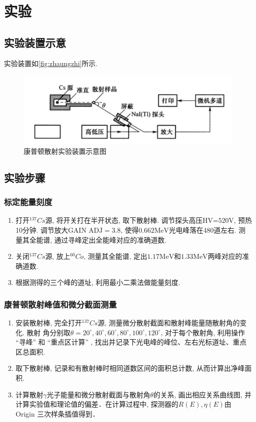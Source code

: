 \documentclass[font=default]{mpltx}
\begin{document}
\section{实验}
\subsection{实验装置示意}
实验装置如\autoref{fig:zhaungzhi}所示. 

\begin{figure}[htbp]
  \centering
  \includegraphics[width=0.6\linewidth]{fig/zhuangzhi.png}
  \caption{康普顿散射实验装置示意图}
  \label{fig:zhaungzhi}
\end{figure}


\subsection{实验步骤}
  \subsubsection{标定能量刻度}
    \begin{enumerate}
      \item 打开${^{137}Cs}$源, 将开关打在半开状态, 取下散射棒. 调节探头高压$\text{HV=520V}$, 预热10分钟. 调节放大$\text{GAIN ADJ} = 3.8$, 使得$0.662\text{MeV}$光电峰落在480道左右. 测量其全能谱, 通过寻峰定出全能峰对应的准确道数.
      \item 关闭${^{137}Cs}$源, 放上${^{60}Co}$, 测量其全能谱, 定出$1.17\text{MeV}$和$1.33\text{MeV}$两峰对应的准确道数.
      \item 根据测得的三个峰的道址, 利用最小二乘法做能量刻度. 
    \end{enumerate}

  \subsubsection{康普顿散射峰值和微分截面测量}
    \begin{enumerate}
      \item 安装散射棒, 完全打开${^{137}Cs}$源, 测量微分散射截面和散射峰能量随散射角的变化. 散射
      角分别取$\theta = 20^\circ,40^\circ ,60^\circ ,80^\circ ,100^\circ ,120^\circ $, 对于每个散射角, 利用操作
       “寻峰” 和 “重点区计算” , 找出并记录下光电峰的峰位、左右光标道址、重点区总面积. 
      \item 取下散射棒, 记录和有散射棒时相同道数区间的面积总计数, 从而计算出净峰面积.
      \item 计算散射$\gamma$光子能量和微分散射截面与散射角$\theta$的关系, 画出相应关系曲线图, 
      并计算实验值和理论值的偏差．在计算过程中, 探测器的$R(E), \eta(E)$由 Origin 三次样条插值得到．
    \end{enumerate}
\end{document}
